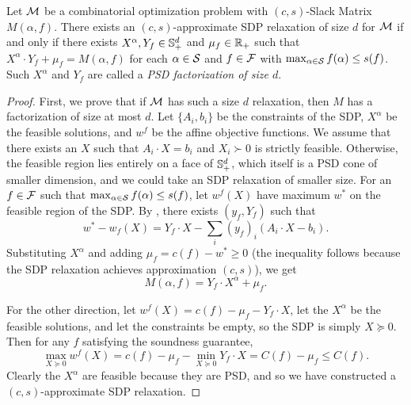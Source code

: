 \begin{theorem}\label{thm:yannakakis}
Let $\mathcal M$ be a combinatorial optimization problem with $(c,s)$-Slack Matrix $M(\alpha,f)$. There exists an $(c,s)$-approximate SDP relaxation of size $d$ for $\mathcal M$ if and only if there exists $X^\alpha,Y_f \in \mathbb{S}^{d}_+$ and $\mu_f \in \mathbb R_+$ such that $X^\alpha \cdot Y_f + \mu_f = M(\alpha,f)$ for each $\alpha \in \mathcal S $ and $f \in \mathcal F$ with $\max_{\alpha \in \mathcal S} f(\alpha) \leq s(f)$. Such $X^\alpha$ and $Y_f$ are called a \emph{PSD factorization of size $d$}.
\end{theorem}
\begin{proof}
First, we prove that if $\mathcal M$ has such a size $d$ relaxation, then $M$ has a factorization of size at most $d$. Let $\{A_i, b_i\}$ be the constraints of the SDP, $X^\alpha$ be the feasible solutions, and $w^f$ be the affine objective functions. We assume that there exists an $X$ such that $A_i \cdot X = b_i$ and $X_i \succ 0$ is strictly feasible. Otherwise, the feasible region lies entirely on a face of $\mathbb{S}^{d}_+$, which itself is a PSD cone of smaller dimension, and we could take an SDP relaxation of smaller size. For an $f \in \mathcal F$ such that $\max_{\alpha \in \mathcal S} f(\alpha) \leq s(f)$, let $w^f(X)$ have maximum $w^*$ on the feasible region of the SDP. By , there exists $(y_f, Y_f)$ such that 
\[w^* - w_f(X) = Y_f \cdot X - \sum_i (y_f)_i(A_i \cdot X - b_i).\]
Substituting $X^\alpha$ and adding $\mu_f = c(f) - w^* \geq 0$ (the inequality follows because the SDP relaxation achieves approximation $(c,s)$), we get
\[M(\alpha,f) = Y_f \cdot X^\alpha + \mu_f.\]

For the other direction, let $w^f(X) = c(f) - \mu_f - Y_f \cdot X$, let the $X^\alpha$ be the feasible solutions, and let the constraints be empty, so the SDP is simply $X \succeq 0$. Then for any $f$ satisfying the soundness guarantee, 
\[\max_{X \succeq 0} w^f(X) = c(f) - \mu_f - \min_{X \succeq 0} Y_f \cdot X = C(f) - \mu_f \leq C(f).\]
Clearly the $X^\alpha$ are feasible because they are PSD, and so we have constructed a $(c,s)$-approximate SDP relaxation.
\end{proof}


